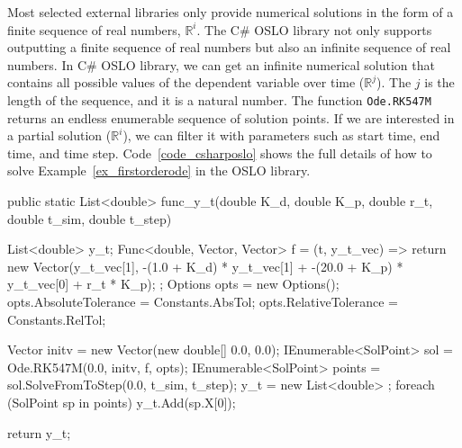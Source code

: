 Most selected external libraries only provide numerical solutions in the form of a finite sequence of real numbers, $\mathbb{R}^i$. The C\# OSLO library not only supports outputting a finite sequence of real numbers but also an infinite sequence of real numbers. In C\# OSLO library, we can get an infinite numerical solution that contains all possible values of the dependent variable over time ($\mathbb{R}^j$). The $j$ is the length of the sequence, and it is a natural number. The function \verb|Ode.RK547M| returns an endless enumerable sequence of solution points. If we are interested in a partial solution ($\mathbb{R}^i$), we can filter it with parameters such as start time, end time, and time step. Code~\ref{code_csharposlo} shows the full details of how to solve Example~\ref{ex_firstorderode} in the OSLO library.
\begin{listing}[ht]
\begin{csharp1}
public static List<double> func_y_t(double K_d, double K_p, double r_t, double t_sim, double t_step) {
    List<double> y_t;
    Func<double, Vector, Vector> f = (t, y_t_vec) => {
        return new Vector(y_t_vec[1], -(1.0 + K_d) * y_t_vec[1] + -(20.0 + K_p) * y_t_vec[0] + r_t * K_p);
    };
    Options opts = new Options();
    opts.AbsoluteTolerance = Constants.AbsTol;
    opts.RelativeTolerance = Constants.RelTol;
    
    Vector initv = new Vector(new double[] {0.0, 0.0});
    IEnumerable<SolPoint> sol = Ode.RK547M(0.0, initv, f, opts);
    IEnumerable<SolPoint> points = sol.SolveFromToStep(0.0, t_sim, t_step);
    y_t = new List<double> {};
    foreach (SolPoint sp in points) {
        y_t.Add(sp.X[0]);
    }
    
    return y_t;
}
\end{csharp1}
\label{code_csharposlo}
\end{listing}

